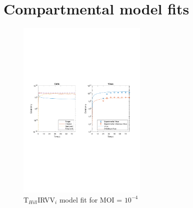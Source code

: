\newpage

\section{Compartmental model fits}
\label{appendix:compartmentalModelFits}

\begin{figure}[H]
\begin{center}
\includegraphics[width=0.55\textwidth, trim={1cm 9.5cm 1cm 9.5cm}, clip]{D_chapters/6_appendix/4_THillIRVVi/ModelTHillIRVViDSNSaenz2010FittedMOI0.0001B0.00075706D0.48368P3170.4056C7.3991e-06TIC3370474.3371TH3.9395iFrac0.02289log.pdf}
\caption[T$_{Hill}$IRVV$_i$ model fit for MOI = $10^{-4}$]%
{T$_{Hill}$IRVV$_i$ model fit for MOI = $10^{-4}$}
\label{figure:THillIRVViMOI00001}
\end{center}
\end{figure}

